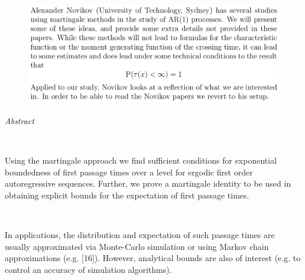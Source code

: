 \documentclass[c, dvipsnames, 8pt]{beamer}
\begin{document}
\begin{frame}[shrink=5]
	
	
	
	\frametitle{\insertsection} 
	\begin{figure}
		\centering
		\includegraphics[width=1\linewidth]{screenshot041}
		\label{fig:screenshot001}
	\end{figure}
	
	
\textit{	Abstract}
	
	\
	
	Using the martingale approach we find sufficient conditions for exponential
	boundedness of first passage times over a level for ergodic first order autoregressive
	sequences. Further, we prove a martingale identity to be used in obtaining explicit
	bounds for the expectation of first passage times.
	
	
	\
	
	In applications, the distribution and expectation of such passage times are usually
	approximated via Monte-Carlo simulation or using Markov chain approximations
	(e.g. [16]). However, analytical bounds are also of interest (e.g. to control an accuracy of
	simulation algorithms).
	
\end{frame}
\end{document}

